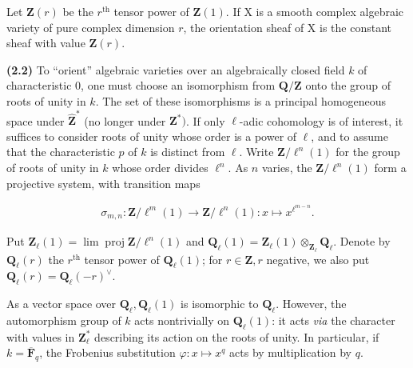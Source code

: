 \documentclass[10pt,leqno]{article}
\begin{document}
\noindent Let \(\mathbf{Z}(r)\) be the \(r^{\mathrm{th}}\) tensor power of \(\mathbf{Z}(1)\). If \(\mathrm{X}\) is a smooth complex algebraic variety of pure complex dimension \(r\), the orientation sheaf of \(\mathrm{X}\) is the constant sheaf with value \(\mathbf{Z}(r)\).\par

\noindent \textbf{(2.2)} To “orient” algebraic varieties over an algebraically closed field \(k\) of characteristic 0, one must choose an isomorphism from \(\mathbf{Q}/\mathbf{Z}\) onto the group of roots of unity in \(k\). The set of these isomorphisms is a principal homogeneous space under \(\widehat{\mathbf{Z}}^{*}\) (no longer under \(\mathbf{Z}^{*})\). If only \(\ell \)-adic cohomology is of interest, it suffices to consider roots of unity whose order is a power of \(\ell \), and to assume that the characteristic \(p\) of \(k\) is distinct from \(\ell \). Write \(\mathbf{Z}/\ell ^{n}(1)\) for the group of roots of unity in \(k\) whose order divides \(\ell ^{n}\). As \(n\) varies, the \(\mathbf{Z}/\ell ^{n}(1)\) form a projective system, with transition maps\par

\begin{equation*}\begin{gathered}\sigma _{m,n} : \mathbf{Z}/\ell ^{m}(1) \longrightarrow  \mathbf{Z}/\ell ^{n}(1) : x\longmapsto x^{\ell ^{m- n}}.\end{gathered}\end{equation*}

\noindent Put \(\mathbf{Z}_{\ell }(1)=\operatorname{lim} \operatorname{proj} \mathbf{Z}/\ell ^{n}(1)\) and \(\mathbf{Q}_{\ell }(1)=\mathbf{Z}_{\ell }(1)\otimes _{\mathbf{Z}_{\ell }}\mathbf{Q}_{\ell }\). Denote by \(\mathbf{Q}_{\ell }(r)\) the \(r^{\mathrm{th}}\) tensor power of \(\mathbf{Q}_{\ell }(1)\); for \(r\in \mathbf{Z}, r\) negative, we also put \(\mathbf{Q}_{\ell }(r)=\mathbf{Q}_{\ell }(- r)^{\vee }\).\par

\clearpage

\label{physical-10}

\noindent As a vector space over \(\mathbf{Q}_{\ell }, \mathbf{Q}_{\ell }(1)\) is isomorphic to \(\mathbf{Q}_{\ell }\). However, the automorphism group of \(k\) acts nontrivially on \(\mathbf{Q}_{\ell }(1)\): it acts \emph{via} the character with values in \(\mathbf{Z}_{\ell }^{*}\) describing its action on the roots of unity. In particular, if \(k=\overline{\mathbf{F}}_{q}\), the Frobenius substitution \(\varphi  : x\longmapsto x^{q}\) acts by multiplication by \(q\).\par
\end{document}
